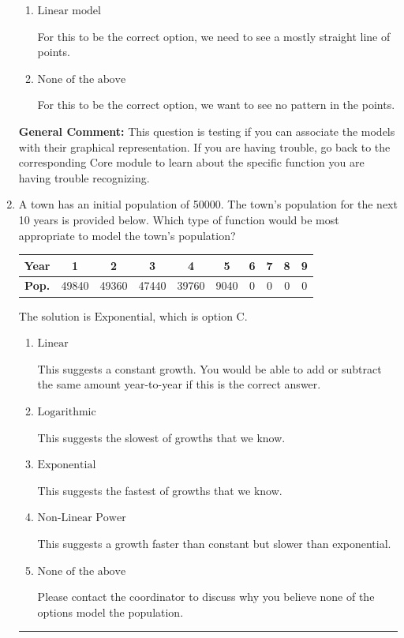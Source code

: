 \documentclass{extbook}[14pt]
\newcommand{\litem}[1]{\item #1

\rule{\textwidth}{0.4pt}}
\begin{document}
\begin{enumerate}
{\begin{enumerate}[label=\Alph*.]
For this to be the correct option, we want a rapid change early, then an extremely slow change later.
\item \( \text{Linear model} \)

For this to be the correct option, we need to see a mostly straight line of points.
\item \( \text{None of the above} \)

For this to be the correct option, we want to see no pattern in the points.
\end{enumerate}

\textbf{General Comment:} This question is testing if you can associate the models with their graphical representation. If you are having trouble, go back to the corresponding Core module to learn about the specific function you are having trouble recognizing.
}
\litem{
A town has an initial population of 50000. The town's population for the next 10 years is provided below. Which type of function would be most appropriate to model the town's population?



\begin{tabular}{c|c|c|c|c|c|c|c|c|c}
\textbf{Year} & 1 & 2 & 3 & 4 & 5 & 6 & 7 & 8 & 9 \tabularnewline
\hline
\textbf{Pop.} & 49840 & 49360 & 47440 & 39760 & 9040 & 0 & 0 & 0 & 0
\end{tabular} 

The solution is \( \text{Exponential} \), which is option C.\begin{enumerate}[label=\Alph*.]
\item \( \text{Linear} \)

This suggests a constant growth. You would be able to add or subtract the same amount year-to-year if this is the correct answer.
\item \( \text{Logarithmic} \)

This suggests the slowest of growths that we know.
\item \( \text{Exponential} \)

This suggests the fastest of growths that we know.
\item \( \text{Non-Linear Power} \)

This suggests a growth faster than constant but slower than exponential.
\item \( \text{None of the above} \)

Please contact the coordinator to discuss why you believe none of the options model the population.
\end{enumerate}

}
\end{enumerate}
\end{document}
